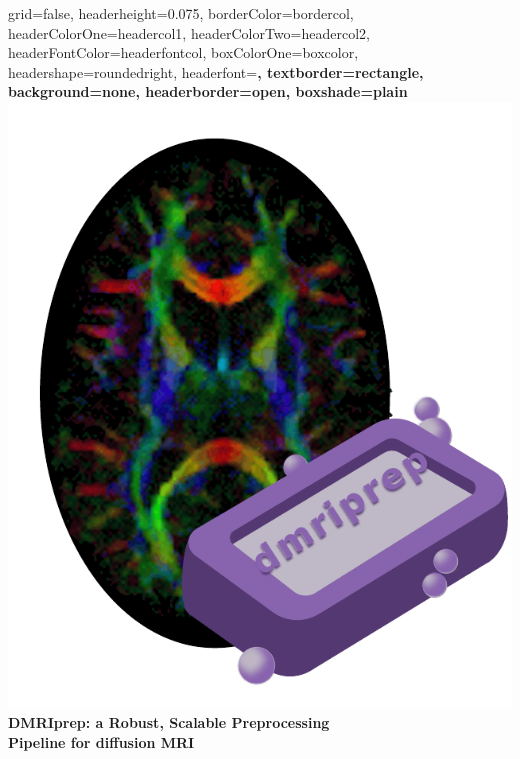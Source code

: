 \documentclass[a0paper,portrait,fontscale=0.395]{baposter}
\begin{document}
\begin{poster}{
grid=false,
headerheight=0.075\textheight,
borderColor=bordercol, %
headerColorOne=headercol1, %
headerColorTwo=headercol2, %
headerFontColor=headerfontcol, %
boxColorOne=boxcolor, %
headershape=roundedright, %
headerfont=\Large\sf\bf, %
textborder=rectangle,
background=none,
headerborder=open, %
boxshade=plain
}
{\includegraphics[scale=0.3]{dmriprep_icon.pdf}}
%
%
{\sf\bf DMRIprep: a Robust, Scalable Preprocessing \\ Pipeline for diffusion MRI} %

\end{poster}
\end{document}
